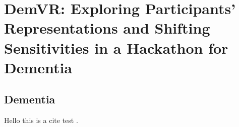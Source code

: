 \chapter{DemVR: Exploring Participants' Representations and Shifting Sensitivities in a Hackathon for Dementia}
\label{DemVR}

\section{Dementia}
\label{sec:Dementia}
Hello this is a cite test \cite{hodge2019exploring}.  \citep{hodge2019exploring}
